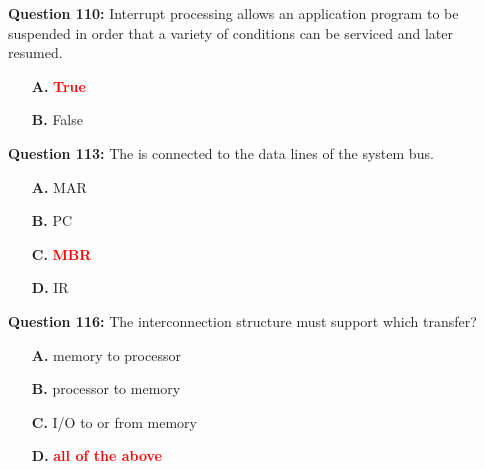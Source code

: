 \documentclass[12pt,a4paper]{article}
\begin{document}
\vspace{0.5cm}

\vspace{0.5cm}

\vspace{0.5cm}

\vspace{0.5cm}

\textbf{Question 110:} Interrupt processing allows an application program to be suspended in order that a variety of conditions can be serviced and later resumed.

\begin{itemize}
    \item[\textbf{A.}] \textcolor{red}{\textbf{True}}
    \item[\textbf{B.}] False
\end{itemize}

\vspace{0.5cm}

\vspace{0.5cm}

\textbf{Question 113:} The \underline{\hspace{1.5cm}} is connected to the data lines of the system bus.

\begin{itemize}
    \item[\textbf{A.}] MAR
    \item[\textbf{B.}] PC
    \item[\textbf{C.}] \textcolor{red}{\textbf{MBR}}
    \item[\textbf{D.}] IR
\end{itemize}

\vspace{0.5cm}

\vspace{0.5cm}

\textbf{Question 116:} The interconnection structure must support which transfer?

\begin{itemize}
    \item[\textbf{A.}] memory to processor
    \item[\textbf{B.}] processor to memory
    \item[\textbf{C.}] I/O to or from memory
    \item[\textbf{D.}] \textcolor{red}{\textbf{all of the above}}
\end{itemize}

\vspace{0.5cm}
\end{document}
